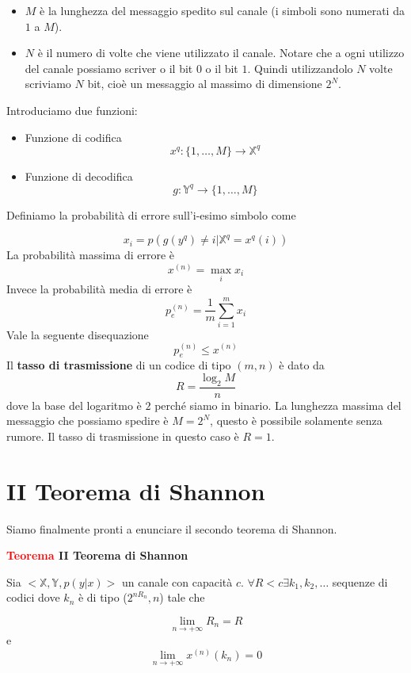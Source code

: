 \documentclass[12pt]{report}
\begin{document}
    \begin{itemize}
        \item $M$ è la lunghezza del messaggio spedito sul canale (i simboli sono numerati da $1$ a $M$).
        \item $N$ è il numero di volte che viene utilizzato il canale. Notare che a ogni utilizzo del canale possiamo scriver o il bit $0$ o il bit $1$. Quindi utilizzandolo $N$ volte scriviamo $N$ bit, cioè un messaggio al massimo di dimensione $2^N$.
    \end{itemize}

    \noindent
    Introduciamo due funzioni:
    \begin{itemize}
        \item Funzione di codifica $$x^q : \{1,\dots,M\} \rightarrow \mathbb{X}^q$$
        \item Funzione di decodifica $$g: \mathbb{Y}^q \rightarrow \{1,\dots,M\}$$
    \end{itemize}
    Definiamo la probabilità di errore sull'i-esimo simbolo come

    $$x_i = p(g(y^q) \neq i | \mathbb{X}^q = x^q(i))$$
    La probabilità massima di errore è
    $$x^{(n)} = \max_i x_i$$
    Invece la probabilità media di errore è
    $$p_e^{(n)} = \frac{1}{m}\sum_{i = 1}^m x_i$$
    Vale la seguente disequazione
    $$p_e^{(n)} \leq x^{(n)}$$
    Il \textbf{tasso di trasmissione} di un codice di tipo $(m,n)$ è dato da
    $$R = \frac{\log_2{M}}{n}$$
    dove la base del logaritmo è $2$ perché siamo in binario. La lunghezza massima del messaggio che possiamo spedire è $M = 2^N$, questo è possibile solamente senza rumore. Il tasso di trasmissione in questo caso è $R = 1$.

    \section{II Teorema di Shannon}
    Siamo finalmente pronti a enunciare il secondo teorema di Shannon.

    \vspace{5px}
    \begin{tcolorbox}
        \textbf{\textcolor{red}{Teorema} II Teorema di Shannon}
        \vspace{5px}
        \begin{center}

            Sia $<\mathbb{X},\mathbb{Y},p(y|x)>$ un canale con capacità $c$. $\forall R < c \exists k_1,k_2,\dots $ sequenze di codici dove $k_n$ è di tipo ($2^{nR_n},n$)
            tale che

            $$\lim_{n \rightarrow + \infty} R_n = R$$
            e
            $$\lim_{n \rightarrow + \infty} x^{(n)}(k_n)  = 0$$
        \end{center}
    \end{tcolorbox}
\end{document}
